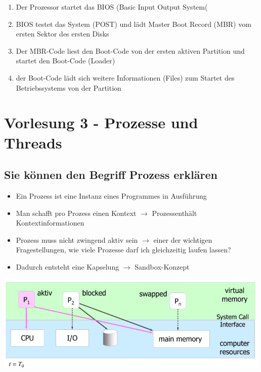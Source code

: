 \documentclass{report}
\newenvironment{Figure}
	{\par\medskip\noindent\minipage{\linewidth}}
	{\endminipage\par\medskip}
\theoremstyle{definition}
\theoremstyle{example}
\begin{document}
\begin{enumerate}
	\item Der Prozessor startet das BIOS (Basic Input Output System(
	\item BIOS testet das System (POST) und lädt Master Boot Record (MBR) vom ersten Sektor des ersten Disks
	\item Der MBR-Code liest den Boot-Code von der ersten aktiven Partition und startet den Boot-Code (Loader)
	\item der Boot-Code lädt sich weitere Informationen (Files) zum Startet des Betriebssystems von der Partition
\end{enumerate}


\chapter{Vorlesung 3 - Prozesse und Threads}

\section{Sie können den Begriff Prozess erklären}
\begin{itemize}
	\item Ein Prozess ist eine Instanz eines Programmes in Ausführung
	\item Man schafft pro Prozess einen Kontext $\rightarrow$ Prozessenthält Kontextinformationen
	\item Prozess muss nicht zwingend aktiv sein $\rightarrow$ einer der wichtigen Fragestellungen, wie viele Prozesse darf ich gleichzeitig laufen lassen?
	\item Dadurch entsteht eine Kapselung $\rightarrow$ Sandbox-Konzept
\end{itemize}

\begin{Figure}
\centering
\includegraphics[width=500px]{img/SchnappschussLaufzeit.png}
	\label{fig:Schnappschuss Prozess Kontext}
\end{Figure}
\end{document}

